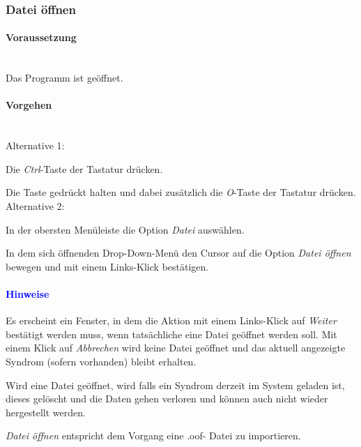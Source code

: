 \documentclass[enabledeprecatedfontcommands,fontsize=11pt,paper=a4,twoside]{scrartcl}
\newcounter{one}
\newcounter{two}[one]
\newcommand*{\hint}{\paragraph{\textcolor{blue}{Hinweise}}}
\newcommand*{\condition}{\paragraph{Voraussetzung}$\;$ \vspace{0.2cm}\\}
\newcommand*{\actions}{\paragraph{Vorgehen} $\;$\vspace{0.2cm}\\}
\newcommand*{\aOne}{\textcolor{bbe}{Alternative 1:}}
\newcommand*{\aTwo}{\textcolor{bbe}{Alternative 2:}}
\let\tempone\itemize
\let\temptwo\enditemize
\renewenvironment{itemize}{\tempone\addtolength{\itemsep}{-10.0pt}}{\temptwo}
\let\origenumerate\enumerate
\let\origendenumerate\endenumerate
\renewenvironment{enumerate}{\origenumerate \addtolength{\itemsep}{-10.0pt}}{\origendenumerate}
\begin{document}
\subsubsection{Datei öffnen}
		\condition 	
		Das Programm ist geöffnet.
		\actions
		\aOne
		\begin{enumerate}
				\item Die \textit{Ctrl}-Taste der Tastatur drücken.
				\item Die Taste gedrückt halten und dabei zusätzlich die \textit{O}-Taste der Tastatur drücken.
		\end{enumerate}				
		\aTwo
		\begin{enumerate}
				\item In der obersten Menüleiste die Option \textit{Datei} auswählen. 
				\item In dem sich öffnenden Drop-Down-Menü den Cursor auf die Option \textit{Datei öffnen} bewegen und mit einem Links-Klick bestätigen.
		\end{enumerate}		
		\hint
		\begin{itemize}
				\item Es erscheint ein Fenster, in dem die Aktion mit einem Links-Klick auf \textit{Weiter} bestätigt werden muss, wenn tatsächliche eine Datei geöffnet werden soll. Mit einem Klick auf \textit{Abbrechen} wird keine Datei geöffnet und das aktuell angezeigte Syndrom (sofern vorhanden) bleibt erhalten.
				\item  Wird eine Datei geöffnet, wird falls ein Syndrom derzeit im System geladen ist, dieses gelöscht und die Daten gehen verloren und können auch nicht wieder hergestellt werden. 
				\item \textit{Datei öffnen} entspricht dem Vorgang eine .oof- Datei zu importieren. \\
		\end{itemize}

\end{document}
